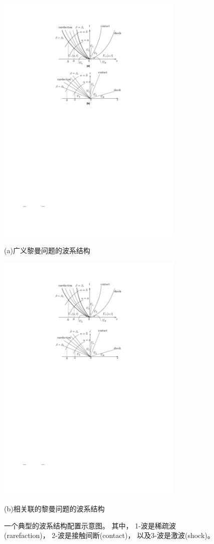 \begin{figure}[htbp]
  \centering
  \includegraphics[width=0.8\textwidth]{fig/GRP_wave_pattern.pdf}
  \begin{center}(a)广义黎曼问题的波系结构\end{center}
  \includegraphics[width=0.8\textwidth]{fig/RP_wave_pattern.pdf}
  \begin{center}(b)相关联的黎曼问题的波系结构\end{center}
  \caption{一个典型的波系结构配置示意图。
    其中，
    1-波是稀疏波(rarefaction)，
    2-波是接触间断(contact)，
    以及3-波是激波(shock)。
  }
  \label{fig:wave_pattern}
\end{figure}

